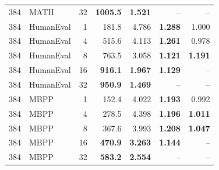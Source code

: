 \documentclass{article}
\begin{document}
\begin{table}[H]
\begin{tabular}{@{}rlrrrrr@{}}
384 & MATH & 32 & \textbf{1005.5} & \textbf{1.521} & -- & --\\
384 & HumanEval & 1 & 181.8 & 4.786 & \textbf{1.288} & 1.000\\
384 & HumanEval & 4 & 515.6 & 4.113 & \textbf{1.261} & 0.978\\
384 & HumanEval & 8 & 763.5 & 3.058 & \textbf{1.121} & \textbf{1.191}\\
384 & HumanEval & 16 & \textbf{916.1} & \textbf{1.967} & \textbf{1.129} & --\\
384 & HumanEval & 32 & \textbf{950.9} & \textbf{1.469} & -- & --\\
384 & MBPP & 1 & 152.4 & 4.022 & \textbf{1.193} & 0.992\\
384 & MBPP & 4 & 278.5 & 4.398 & \textbf{1.196} & \textbf{1.011}\\
384 & MBPP & 8 & 367.6 & 3.993 & \textbf{1.208} & \textbf{1.047}\\
384 & MBPP & 16 & \textbf{470.9} & \textbf{3.263} & \textbf{1.144} & --\\
384 & MBPP & 32 & \textbf{583.2} & \textbf{2.554} & -- & --\\
\bottomrule
\end{tabular}
\end{table}
\end{document}
